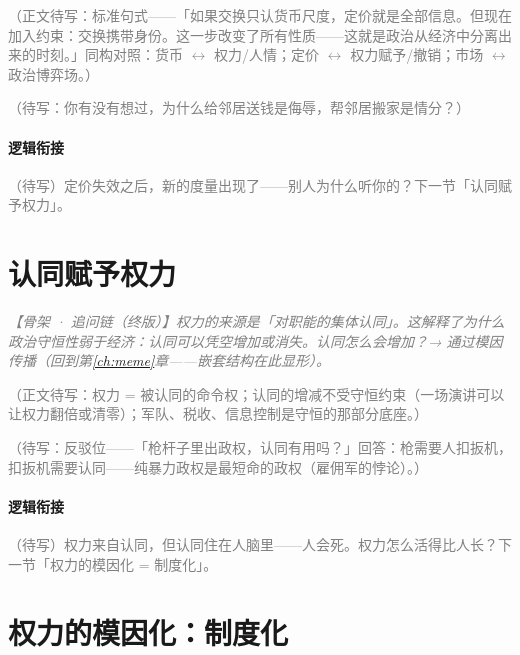 \documentclass[../../main2.tex]{subfiles}
\begin{document}
	\textcolor{gray}{（正文待写：标准句式——「如果交换只认货币尺度，定价就是全部信息。但现在加入约束：交换携带身份。这一步改变了所有性质——这就是政治从经济中分离出来的时刻。」同构对照：货币 $\leftrightarrow$ 权力/人情；定价 $\leftrightarrow$ 权力赋予/撤销；市场 $\leftrightarrow$ 政治博弈场。）}

	\begin{readingnote}
		\textcolor{gray}{（待写：你有没有想过，为什么给邻居送钱是侮辱，帮邻居搬家是情分？）}
	\end{readingnote}

	\paragraph*{逻辑衔接}
	\textcolor{gray}{（待写）定价失效之后，新的度量出现了——别人为什么听你的？下一节「认同赋予权力」。}

	\section{认同赋予权力}
	\label{sec:pol-recognition}

	\textcolor{gray}{\textit{【骨架 · 追问链（终版）】权力的来源是「对职能的集体认同」。这解释了为什么政治守恒性弱于经济：认同可以凭空增加或消失。认同怎么会增加？→ 通过模因传播（回到第\ref{ch:meme}章——嵌套结构在此显形）。}}

	\textcolor{gray}{（正文待写：权力 = 被认同的命令权；认同的增减不受守恒约束（一场演讲可以让权力翻倍或清零）；军队、税收、信息控制是守恒的那部分底座。）}

	\begin{questionbox}
		\textcolor{gray}{（待写：反驳位——「枪杆子里出政权，认同有用吗？」回答：枪需要人扣扳机，扣扳机需要认同——纯暴力政权是最短命的政权（雇佣军的悖论）。）}
	\end{questionbox}

	\paragraph*{逻辑衔接}
	\textcolor{gray}{（待写）权力来自认同，但认同住在人脑里——人会死。权力怎么活得比人长？下一节「权力的模因化 = 制度化」。}

	\section{权力的模因化：制度化}
	\label{sec:pol-institutionalization}
\end{document}
